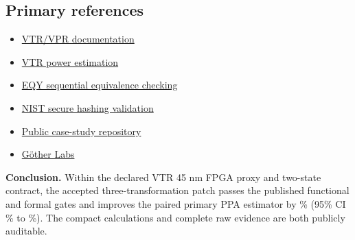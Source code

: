 \documentclass[10pt,a4paper]{article}
\begin{document}
\subsection{Primary references}
\begin{itemize}
  \item \href{https://docs.verilogtorouting.org/en/latest/vpr/}{VTR/VPR documentation}
  \item \href{https://docs.verilogtorouting.org/en/latest/vtr/power_estimation/}{VTR power estimation}
  \item \href{https://github.com/YosysHQ/eqy}{EQY sequential equivalence checking}
  \item \href{https://csrc.nist.gov/projects/cryptographic-algorithm-validation-program/secure-hashing}{NIST secure hashing validation}
  \item \href{https://github.com/juan-fernandez-gotherlabs/rtl-optimization-case-study}{Public case-study repository}
  \item \href{https://www.gotherlabs.com/}{Göther Labs}
\end{itemize}

\vspace{6mm}
\begin{claimbox}
\textbf{Conclusion.} Within the declared VTR 45 nm FPGA proxy and two-state contract, the accepted three-transformation patch passes the published functional and formal gates and improves the paired primary PPA estimator by \CompositeEstimate\% (95\% CI \CompositeLow\% to \CompositeHigh\%). The compact calculations and complete raw evidence are both publicly auditable.
\end{claimbox}
\end{document}
